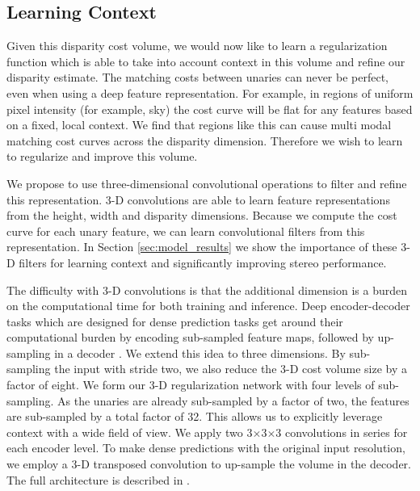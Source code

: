 \subsection{Learning Context}
\label{sec:regularise}

Given this disparity cost volume, we would now like to learn a regularization function which is able to take into account context in this volume and refine our disparity estimate. The matching costs between unaries can never be perfect, even when using a deep feature representation. For example, in regions of uniform pixel intensity (for example, sky) the cost curve will be flat for any features based on a fixed, local context.  We find that regions like this can cause multi modal matching cost curves across the disparity dimension. Therefore we wish to learn to regularize and improve this volume.

We propose to use three-dimensional convolutional operations to filter and refine this representation. 3-D convolutions are able to learn feature representations from the height, width and disparity dimensions. Because we compute the cost curve for each unary feature, we can learn convolutional filters from this representation. In Section \ref{sec:model_results} we show the importance of these 3-D filters for learning context and significantly improving stereo performance.


The difficulty with 3-D convolutions is that the additional dimension is a burden on the computational time for both training and inference. Deep encoder-decoder tasks which are designed for dense prediction tasks get around their computational burden by encoding sub-sampled feature maps, followed by up-sampling in a decoder \citep{badrinarayanan2017segnet}. We extend this idea to three dimensions. By sub-sampling the input with stride two, we also reduce the 3-D cost volume size by a factor of eight. We form our 3-D regularization network with four levels of sub-sampling. As the unaries are already sub-sampled by a factor of two, the features are sub-sampled by a total factor of 32. This allows us to explicitly leverage context with a wide field of view. We apply two 3$\times$3$\times$3 convolutions in series for each encoder level. To make dense predictions with the original input resolution, we employ a 3-D transposed convolution to up-sample the volume in the decoder. The full architecture is described in .

